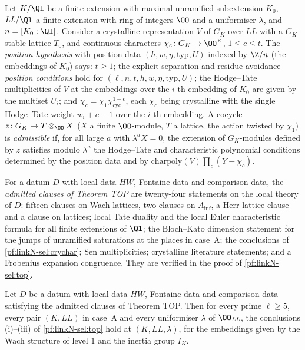 Let $K/\Ql$ be a finite extension with maximal unramified subextension $K_0$, $\mathit{LL}/\Ql$ a finite extension with ring of integers $\OO$
and a uniformiser $\lambda$, and $n=[K_0:\Ql]$. Consider a crystalline representation $V$ of $G_K$ over $\mathit{LL}$ with a $G_K$-stable
lattice $T_0$, and continuous characters $\chi_c\colon G_K\to\OO^\times$, $1\le c\le t$. The \emph{position hypothesis} with position data
$(h,w,\eta,\mathrm{typ},U)$ indexed by $\Z/n$ (the embeddings of $K_0$) says: $t\ge1$; the explicit separation and residue-avoidance
\emph{position conditions} hold for $(\ell,n,t,h,w,\eta,\mathrm{typ},U)$; the Hodge--Tate multiplicities of $V$ at the embeddings over the
$i$-th embedding of $K_0$ are given by the multiset $U_i$; and $\chi_c=\chi_1\chi_{\mathrm{cyc}}^{1-c}$, each $\chi_c$ being crystalline with the
single Hodge--Tate weight $w_i+c-1$ over the $i$-th embedding. A cocycle $z\colon G_K\to T\otimes_\OO X$ ($X$ a finite $\OO$-module, $T$ a lattice,
the action twisted by $\chi_1$) is \emph{admissible} if, for all large $a$ with $\lambda^aX=0$, the extension of $G_K$-modules defined by $z$
satisfies modulo $\lambda^a$ the Hodge--Tate and characteristic polynomial conditions determined by the position data and by
$\mathrm{charpoly}(V)\prod_c(Y-\chi_c)$.

\begin{definition}\label{pf:linkN-sel:topadm}
For a datum $D$ with local data $HW$, Fontaine data and comparison data, the \emph{admitted clauses of Theorem TOP} are twenty-four statements
on the local theory of $D$: fifteen clauses on Wach lattices, two clauses on $A_{\inf}$, a Herr lattice clause and a clause on lattices; local Tate
duality and the local Euler characteristic formula for all finite extensions of $\Ql$; the Bloch--Kato dimension statement for the jumps of
unramified saturations at the places in case~A; the conclusions of \cref{pf:linkN-sel:crychar}; Sen multiplicities; crystalline literature
statements; and a Frobenius expansion congruence. They are verified in the proof of \cref{pf:linkN-sel:top}.
\end{definition}

\begin{theorem}\label{pf:linkN-sel:topcore}
Let $D$ be a datum with local data $HW$, Fontaine data and comparison data satisfying the admitted clauses of Theorem TOP. Then for every prime
$\ell\ge5$, every pair $(K,\mathit{LL})$ in case~A and every uniformiser $\lambda$ of $\OO_{\mathit{LL}}$, the conclusions (i)--(iii) of
\cref{pf:linkN-sel:top} hold at $(K,\mathit{LL},\lambda)$, for the embeddings given by the Wach structure of level $1$ and the inertia group
$I_K$.
\end{theorem}

